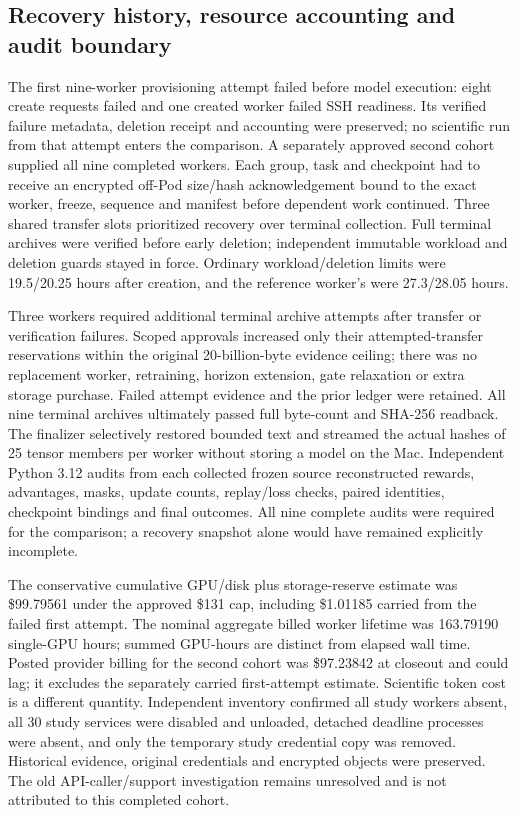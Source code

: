 \documentclass[11pt]{article}
\begin{document}

\subsection{Recovery history, resource accounting and audit boundary}

The first nine-worker provisioning attempt failed before model execution: eight create requests failed and one created worker failed SSH readiness. Its verified failure metadata, deletion receipt and accounting were preserved; no scientific run from that attempt enters the comparison. A separately approved second cohort supplied all nine completed workers. Each group, task and checkpoint had to receive an encrypted off-Pod size/hash acknowledgement bound to the exact worker, freeze, sequence and manifest before dependent work continued. Three shared transfer slots prioritized recovery over terminal collection. Full terminal archives were verified before early deletion; independent immutable workload and deletion guards stayed in force. Ordinary workload/deletion limits were 19.5/20.25 hours after creation, and the reference worker's were 27.3/28.05 hours.

Three workers required additional terminal archive attempts after transfer or verification failures. Scoped approvals increased only their attempted-transfer reservations within the original 20-billion-byte evidence ceiling; there was no replacement worker, retraining, horizon extension, gate relaxation or extra storage purchase. Failed attempt evidence and the prior ledger were retained. All nine terminal archives ultimately passed full byte-count and SHA-256 readback. The finalizer selectively restored bounded text and streamed the actual hashes of 25 tensor members per worker without storing a model on the Mac. Independent Python 3.12 audits from each collected frozen source reconstructed rewards, advantages, masks, update counts, replay/loss checks, paired identities, checkpoint bindings and final outcomes. All nine complete audits were required for the comparison; a recovery snapshot alone would have remained explicitly incomplete.

The conservative cumulative GPU/disk plus storage-reserve estimate was \$99.79561 under the approved \$131 cap, including \$1.01185 carried from the failed first attempt. The nominal aggregate billed worker lifetime was 163.79190 single-GPU hours; summed GPU-hours are distinct from elapsed wall time. Posted provider billing for the second cohort was \$97.23842 at closeout and could lag; it excludes the separately carried first-attempt estimate. Scientific token cost is a different quantity. Independent inventory confirmed all study workers absent, all 30 study services were disabled and unloaded, detached deadline processes were absent, and only the temporary study credential copy was removed. Historical evidence, original credentials and encrypted objects were preserved. The old API-caller/support investigation remains unresolved and is not attributed to this completed cohort.
\end{document}
